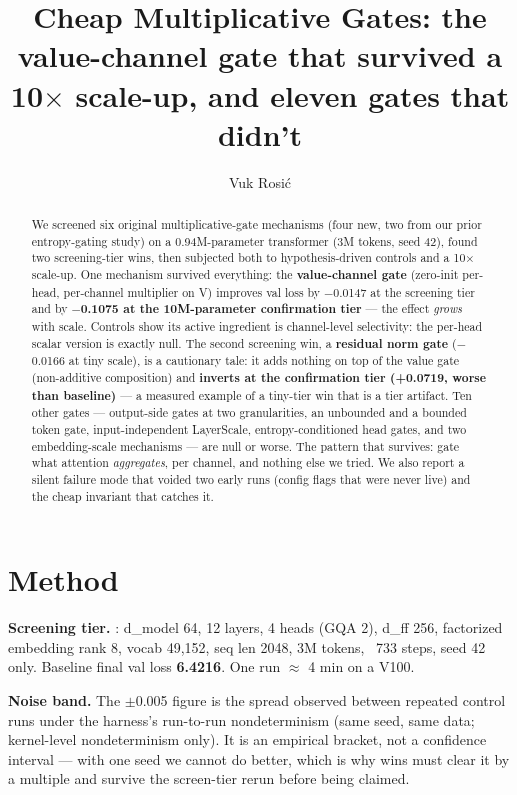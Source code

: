 \documentclass[11pt,a4paper]{article}
\title{Cheap Multiplicative Gates: the value-channel gate that survived a 10$\times$ scale-up, and eleven gates that didn't}
\author{Vuk Rosić}
\date{}
\begin{document}
\maketitle

\begin{abstract}
We screened six original multiplicative-gate mechanisms (four new, two from our prior entropy-gating study) on a 0.94M-parameter transformer (3M tokens, seed 42), found two screening-tier wins, then subjected both to hypothesis-driven controls and a 10$\times$ scale-up. One mechanism survived everything: the \textbf{value-channel gate} (zero-init per-head, per-channel multiplier on V) improves val loss by $-$0.0147 at the screening tier and by \textbf{$-$0.1075 at the 10M-parameter confirmation tier} --- the effect \emph{grows} with scale. Controls show its active ingredient is channel-level selectivity: the per-head scalar version is exactly null. The second screening win, a \textbf{residual norm gate} ($-$0.0166 at tiny scale), is a cautionary tale: it adds nothing on top of the value gate (non-additive composition) and \textbf{inverts at the confirmation tier (+0.0719, worse than baseline)} --- a measured example of a tiny-tier win that is a tier artifact. Ten other gates --- output-side gates at two granularities, an unbounded and a bounded token gate, input-independent LayerScale, entropy-conditioned head gates, and two embedding-scale mechanisms --- are null or worse. The pattern that survives: gate what attention \emph{aggregates}, per channel, and nothing else we tried. We also report a silent failure mode that voided two early runs (config flags that were never live) and the cheap invariant that catches it.
\end{abstract}

\section{Method}

\textbf{Screening tier.} \texttt{}: d\_model 64, 12 layers, 4 heads (GQA 2), d\_ff 256, factorized embedding rank 8, vocab 49,152, seq len 2048, 3M tokens, ~733 steps, seed 42 only. Baseline final val loss \textbf{6.4216}. One run $\approx$ 4 min on a V100.

\textbf{Noise band.} The $\pm$0.005 figure is the spread observed between repeated control runs under the harness's run-to-run nondeterminism (same seed, same data; kernel-level nondeterminism only). It is an empirical bracket, not a confidence interval --- with one seed we cannot do better, which is why wins must clear it by a multiple and survive the screen-tier rerun before being claimed.
\end{document}

